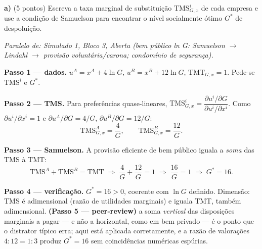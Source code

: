 \textbf{a)} (5 pontos) Escreva a taxa marginal de substitui\c{c}\~ao $\text{TMS}^i_{G,x}$ de cada empresa e use a condi\c{c}\~ao de Samuelson para encontrar o n\'ivel socialmente \'otimo $G^*$ de despolui\c{c}\~ao.
\resolucaobox{7.2cm}
\begin{solucao}
{\footnotesize\textit{Paralelo de: Simulado 1, Bloco 3, Aberta (bem público ln G: Samuelson $\to$ Lindahl $\to$ provisão voluntária/carona; condomínio de segurança).}}\par\vspace{0.2em}
\textbf{Passo 1 --- dados.} $u^A=x^A+4\ln G$, $u^B=x^B+12\ln G$, $\text{TMT}_{G,x}=1$. Pede-se $\text{TMS}^i$ e $G^*$.

\textbf{Passo 2 --- TMS.} Para prefer\^encias quase-lineares, $\text{TMS}^i_{G,x}=\dfrac{\partial u^i/\partial G}{\partial u^i/\partial x^i}$. Como $\partial u^i/\partial x^i=1$ e $\partial u^A/\partial G=4/G$, $\partial u^B/\partial G=12/G$:
\[
\text{TMS}^A_{G,x}=\frac{4}{G},\qquad \text{TMS}^B_{G,x}=\frac{12}{G}.
\]

\textbf{Passo 3 --- Samuelson.} A provis\~ao eficiente de bem p\'ublico iguala a \emph{soma} das TMS \`a TMT:
\[
\text{TMS}^A+\text{TMS}^B=\text{TMT}\;\Longrightarrow\;\frac{4}{G}+\frac{12}{G}=1\;\Longrightarrow\;\frac{16}{G}=1\;\Longrightarrow\; G^{*}=16.
\]

\textbf{Passo 4 --- verifica\c{c}\~ao.} $G^{*}=16>0$, coerente com $\ln G$ definido. Dimens\~ao: TMS \'e adimensional (raz\~ao de utilidades marginais) e iguala TMT, tamb\'em adimensional. \textbf{(Passo 5 --- peer-review)} a soma \emph{vertical} das disposi\c{c}\~oes marginais a pagar --- e n\~ao a horizontal, como em bem privado --- \'e o ponto que o distrator t\'ipico erra; aqui est\'a aplicada corretamente, e a raz\~ao de valora\c{c}\~oes $4{:}12=1{:}3$ produz $G^{*}=16$ sem coincid\^encias num\'ericas esp\'urias.


\end{solucao}

